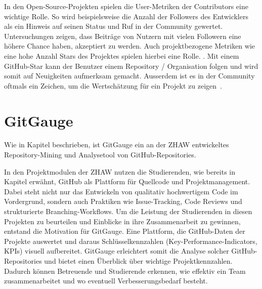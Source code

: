 In den Open-Source-Projekten spielen die User-Metriken der Contributors eine \linebreak wichtige Rolle. So wird beispielsweise die Anzahl der Followers des Entwicklers als ein Hinweis auf seinen Status und Ruf in der Community gewertet. Untersuchungen zeigen, dass Beiträge von Nutzern mit vielen Followern eine höhere Chance haben, akzeptiert zu werden. Auch projektbezogene Metriken wie eine hohe Anzahl Stars des Projektes spielen hierbei eine Rolle. \parencite{tsay_influence_2014}. Mit einem GitHub-Star kann der Benutzer einem Repository / Organisation folgen und wird somit auf Neuigkeiten aufmerksam gemacht. Ausserdem ist es in der Community oftmals ein Zeichen, um die Wertschätzung für ein Projekt zu zeigen~\parencite{noauthor_saving_nodate}. \parencite{tsay_influence_2014}

\section{GitGauge}
Wie in Kapitel  beschrieben, ist GitGauge ein an der ZHAW entwickeltes Repository-Mining und Analysetool von GitHub-Repositories.

In den Projektmodulen der ZHAW nutzen die Studierenden, wie bereits in Kapitel  erwähnt,  GitHub als Plattform für Quellcode und Projektmanagement. Dabei steht nicht nur das Entwickeln von qualitativ hochwertigem Code im Vordergrund, sondern auch Praktiken wie Issue-Tracking, Code Reviews und strukturierte Branching-Workflows. Um die Leistung der Studierenden in diesen Projekten zu beurteilen und Einblicke in ihre Zusammenarbeit zu gewinnen, entstand die Motivation für GitGauge. Eine Plattform, die GitHub-Daten der Projekte auswertet und daraus Schlüsselkennzahlen (Key-Performance-Indicators, KPIs) visuell aufbereitet. GitGauge erleichtert somit die Analyse solcher GitHub-Repositories und bietet einen Überblick über wichtige Projektkennzahlen. Dadurch können Betreuende und Studierende erkennen, wie effektiv ein Team zusammenarbeitet und wo eventuell Verbesserungsbedarf besteht. \parencite{grand_joel_vt1_joelgrand_repository_2024}

